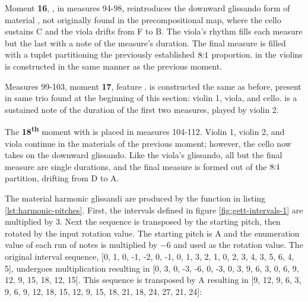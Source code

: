 Moment \textbf{16}, , in measures 94-98, reintroduces the downward glissando form of material , not originally found in the precompositional map, where the cello sustains C and the viola drifts from F to B. The viola's rhythm fills each measure but the last with a note of the measure's duration. The final measure is filled with a tuplet partitioning the previously established $8\hspace{-1mm}:\hspace{-1mm}1$ proportion.  in the violins is constructed in the same manner as the previous moment.

Measures 99-103, moment \textbf{17}, feature .  is constructed the same as before, present in same trio found at the beginning of this section: violin 1, viola, and cello.  is a sustained note of the duration of the first two measures, played by violin 2.

The \textbf{18\textsuperscript{th}} moment with  is placed in measures 104-112. Violin 1, violin 2, and viola continue in the materials of the previous moment; however, the cello now takes on the  downward glissando. Like the viola's glissando, all but the final measure are single durations, and the final measure is formed out of the $8\hspace{-1mm}:\hspace{-1mm}1$ partition, drifting from D to A.


The material  harmonic glissandi are produced by the function in listing \ref{lst:harmonic-pitches}. First, the intervals defined in figure \ref{fig:gett-intervals-1} are multiplied by 3. Next the sequence is transposed by the starting pitch, then rotated by the input rotation value. The starting pitch is A and the enumeration value of each run of notes is multiplied by $-6$ and used as the rotation value. The original interval sequence, [0, 1, 0, -1, -2, 0, -1, 0, 1, 3, 2, 1, 0, 2, 3, 4, 3, 5, 6, 4, 5], undergoes multiplication resulting in [0, 3, 0, -3, -6, 0, -3, 0, 3, 9, 6, 3, 0, 6, 9, 12, 9, 15, 18, 12, 15]. This sequence is transposed by A resulting in [9, 12, 9, 6, 3, 9, 6, 9, 12, 18, 15, 12, 9, 15, 18, 21, 18, 24, 27, 21, 24]:

